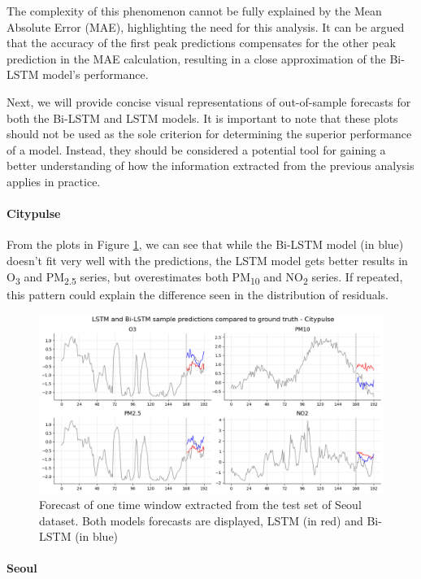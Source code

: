 The complexity of this phenomenon cannot be fully explained by the Mean Absolute Error (MAE), highlighting the need for this analysis. It can be argued that the accuracy of the first peak predictions compensates for the other peak prediction in the MAE calculation, resulting in a close approximation of the Bi-LSTM model's performance.

Next, we will provide concise visual representations of out-of-sample forecasts for both the Bi-LSTM and LSTM models. It is important to note that these plots should not be used as the sole criterion for determining the superior performance of a model. Instead, they should be considered a potential tool for gaining a better understanding of how the information extracted from the previous analysis applies in practice.

\paragraph{Citypulse}
From the plots in Figure \ref{fig:forecasts_aarhus}, we can see that while the Bi-LSTM model (in blue) doesn't fit very well with the predictions, the LSTM model gets better results in O\textsubscript{3} and PM\textsubscript{2.5} series, but overestimates both PM\textsubscript{10} and NO\textsubscript{2} series. If repeated, this pattern could explain the difference seen in the distribution of residuals.

\begin{figure}[h]
    \centering
    \includegraphics[width=1\linewidth]{images/forecasts_aarhus.png}
    \caption{Forecast of one time window extracted from the test set of Seoul dataset. Both models forecasts are displayed, LSTM (in red) and Bi-LSTM (in blue)}
    \label{fig:forecasts_aarhus}
\end{figure}

\paragraph{Seoul}

